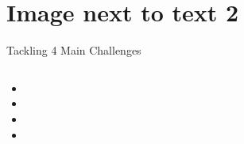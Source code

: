 \section[Image/Text 2]{Image next to text 2}



\begin{frame}{Tackling 4 Main Challenges}
	\begin{columns}
		\begin{column}{0.4\textwidth}
			
			\begin{itemize}
				\item {}
				\item {}
				\item {}
				\item {}
			\end{itemize}
				
		\end{column}
		\begin{column}{0.6\textwidth}
			\only<1>{ %
				
			}
			\only<2>{ %
				
			}
			\only<3>{ %
				
			}
			\only<4>{ %
				
			}
		\end{column}
	\end{columns}
\end{frame}
